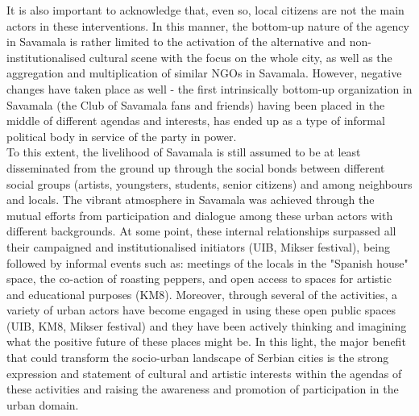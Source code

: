 \documentclass[11pt]{report}
\begin{document}
{{{It is also important to acknowledge that, even so, local citizens are not the main actors in these interventions.
In this manner, the bottom-up nature of the agency in Savamala is rather limited to the activation of the alternative and non-institutionalised cultural scene with the focus on the whole city, as well as the aggregation and multiplication of similar NGOs in Savamala.
However, negative changes have taken place as well - the first intrinsically bottom-up organization in Savamala (the Club of Savamala fans and friends) having been placed in the middle of different agendas and interests, has ended up as a type of informal political body in service of the party in power.
\\

To this extent, the livelihood of Savamala is still assumed to be at least disseminated from the ground up through the social bonds between different social groups (artists, youngsters, students, senior citizens) and among neighbours and locals.
The vibrant atmosphere in Savamala was achieved through the mutual efforts from participation and dialogue among these urban actors with different backgrounds.
At some point, these internal relationships surpassed all their campaigned and institutionalised initiators (UIB, Mikser festival), being followed by informal events such as:
meetings of the locals in the "Spanish house" space, the co-action of roasting peppers, and open access to spaces for artistic and educational purposes (KM8).
Moreover, through several of the activities, a variety of urban actors have become engaged in using these open public spaces (UIB, KM8, Mikser festival) and they have been actively thinking and imagining what the positive future of these places might be. In this light, the major benefit that could transform the socio-urban landscape of Serbian cities is the strong expression and statement of cultural and artistic interests within the agendas of these activities and raising the awareness and promotion of participation in the urban domain.
\\

}}}
\end{document}

